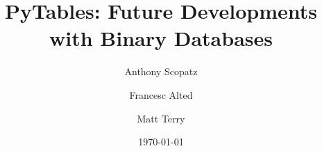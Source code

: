 \documentclass{article}
\begin{document}
\title{PyTables: Future Developments with Binary Databases}
\author{Anthony Scopatz \and 
        Francesc Alted \and
        Matt Terry
        }
\date{\today}

\maketitle
\end{document}
